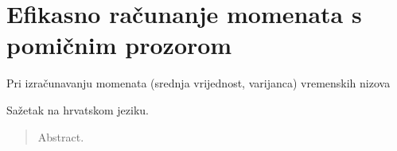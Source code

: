 \documentclass[lmodern, utf8, diplomski, numeric]{fer}
\begin{document}



\appendix
\chapter{Efikasno računanje momenata s pomičnim prozorom}
Pri izračunavanju momenata (srednja vrijednost, varijanca) vremenskih nizova 

\begin{sazetak}
Sažetak na hrvatskom jeziku.

\end{sazetak}

\begin{abstract}
Abstract.

\end{abstract}
\end{document}
